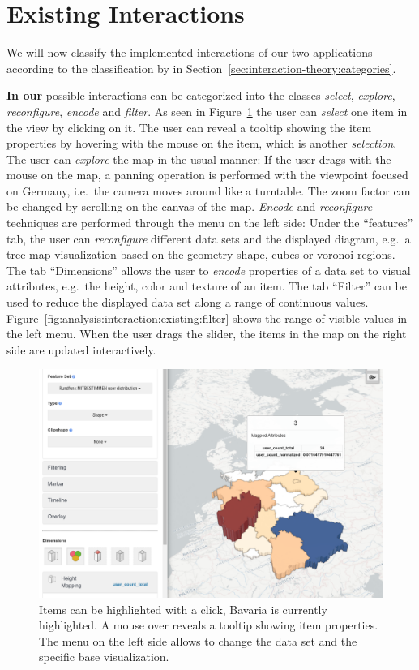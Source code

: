 \section{Existing Interactions}
We will now classify the implemented interactions of our two applications according to the classification by \textcite{Yi2007} in Section~\ref{sec:interaction-theory:categories}.

\textbf{In our \visan{}} possible interactions can be categorized into the classes \emph{select}, \emph{explore}, \emph{reconfigure}, \emph{encode} and \emph{filter}.
As seen in Figure~\ref{fig:analysis:interaction:existing} the user can \emph{select} one item in the view by clicking on it.
The user can reveal a tooltip showing the item properties by hovering with the mouse on the item, which is another \emph{selection}.
The user can \emph{explore} the map in the usual manner:
If the user drags with the mouse on the map, a panning operation is performed with the viewpoint focused on Germany, i.e.\ the camera moves around like a turntable.
The zoom factor can be changed by scrolling on the canvas of the map.
\emph{Encode} and \emph{reconfigure} techniques are performed through the menu on the left side:
Under the ``features'' tab, the user can \emph{reconfigure} different data sets and the displayed diagram, e.g.\ a tree map visualization based on the geometry shape, cubes or voronoi regions.
The tab ``Dimensions'' allows the user to \emph{encode} properties of a data set to visual attributes, e.g.\ the height, color and texture of an item.
The tab ``Filter'' can be used to reduce the displayed data set along a range of continuous values.
Figure~\ref{fig:analysis:interaction:existing:filter} shows the range of visible values in the left menu.
When the user drags the slider, the items in the map on the right side are updated interactively.

\begin{figure}[h]
  \centering
  \includegraphics[width=\textwidth]{images/existing-interactions.png}
  \caption{%
    Items can be highlighted with a click, Bavaria is currently highlighted.
    A mouse over reveals a tooltip showing item properties.
    The menu on the left side allows to change the data set and the specific base visualization.
  }\label{fig:analysis:interaction:existing}
\end{figure}

